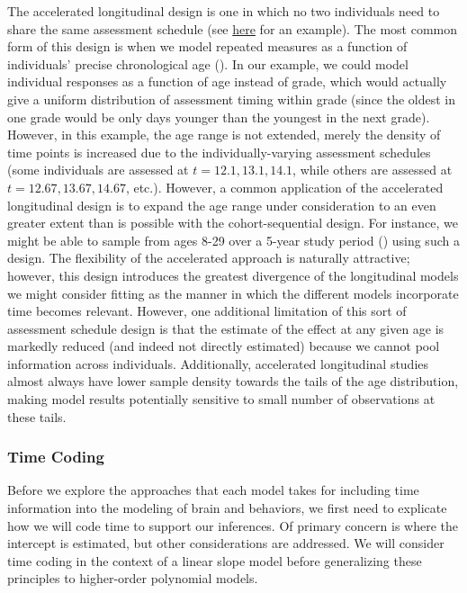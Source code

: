 \documentclass[11pt]{article}
\begin{document}
The accelerated longitudinal design is one in which no two individuals need to share the same assessment schedule (see \href{https://e-m-mccormick.github.io/static/longitudinal-primer/03-time.html#accelerated-design}{here} for an example). The most common form of this design is when we model repeated measures as a function of individuals’ precise chronological age (\cite{braams_longitudinal_2015,mccormick_longitudinal_2021,mehta_people_2005,mills_structural_2016,peters_increased_2017,sorensen_recipe_2021,zhou_accelerated_2015}). In our example, we could model individual responses as a function of age instead of grade, which would actually give a uniform distribution of assessment timing within grade (since the oldest in one grade would be only days younger than the youngest in the next grade). However, in this example, the age range is not extended, merely the density of time points is increased due to the individually-varying assessment schedules (some individuals are assessed at $t = 12.1, 13.1, 14.1$, while others are assessed at $t = 12.67, 13.67, 14.67$, etc.). However, a common application of the accelerated longitudinal design is to expand the age range under consideration to an even greater extent than is possible with the cohort-sequential design. For instance, we might be able to sample from ages 8-29 over a 5-year study period (\cite{braams_longitudinal_2015,mccormick_longitudinal_2021,peters_increased_2017}) using such a design. The flexibility of the accelerated approach is naturally attractive; however, this design introduces the greatest divergence of the longitudinal models we might consider fitting as the manner in which the different models incorporate time becomes relevant. However, one additional limitation of this sort of assessment schedule design is that the estimate of the effect at any given age is markedly reduced (and indeed not directly estimated) because we cannot pool information across individuals. Additionally, accelerated longitudinal studies almost always have lower sample density towards the tails of the age distribution, making model results potentially sensitive to small number of observations at these tails.

\subsubsection{Time Coding}
Before we explore the approaches that each model takes for including time information into the modeling of brain and behaviors, we first need to explicate how we will code time to support our inferences. Of primary concern is where the intercept is estimated, but other considerations are addressed. We will consider time coding in the context of a linear slope model before generalizing these principles to higher-order polynomial models.
\end{document}
